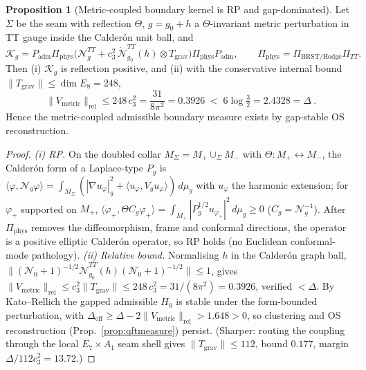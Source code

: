 \documentclass[11pt,a4paper]{article}
\newcommand{\cthree}{c_3}
\theoremstyle{definition}
\newtheorem{proposition}{Proposition}
\begin{document}
\begin{proposition}[Metric-coupled boundary kernel is RP and gap-dominated]
\label{prop:metricrp}
Let $\Sigma$ be the seam with reflection $\Theta$, $g=g_0+h$ a $\Theta$-invariant metric perturbation in
TT gauge inside the Calder\'on unit ball, and
\[
  \mathcal K_g=P_{\mathrm{adm}}\Pi_{\mathrm{phys}}\bigl(\mathcal N^{TT}_g
  +\cthree^2\,\dot{\mathcal N}^{TT}_{g_0}(h)\otimes T_{\mathrm{grav}}\bigr)\Pi_{\mathrm{phys}}P_{\mathrm{adm}},
  \qquad \Pi_{\mathrm{phys}}=\Pi_{\mathrm{BRST/Hodge}}\Pi_{TT}.
\]
Then (i) $\mathcal K_g$ is reflection positive, and (ii) with the conservative internal bound
$\|T_{\mathrm{grav}}\|\le\dim E_8=248$,
\[
  \boxed{\ \|V_{\mathrm{metric}}\|_{\mathrm{rel}}\le 248\,\cthree^2=\frac{31}{8\pi^2}=0.3926
  \;<\;6\log\tfrac32=2.4328=\Delta\ }.
\]
Hence the metric-coupled admissible boundary measure exists by gap-stable OS reconstruction.
\end{proposition}
\begin{proof}
\emph{(i) RP.} On the doubled collar $M_\Sigma=M_+\cup_\Sigma M_-$ with $\Theta:M_+\leftrightarrow M_-$,
the Calder\'on form of a Laplace-type $P_g$ is
$\langle\varphi,\mathcal N_g\varphi\rangle=\int_{M_\Sigma}(|\nabla u_\varphi|_g^2+\langle u_\varphi,V_g u_\varphi\rangle)\,d\mu_g$
with $u_\varphi$ the harmonic extension; for $\varphi_+$ supported on $M_+$,
$\langle\varphi_+,\Theta C_g\varphi_+\rangle=\int_{M_+}|P_g^{1/2}u_{\varphi_+}|^2\,d\mu_g\ge0$
($C_g=\mathcal N_g^{-1}$). After $\Pi_{\mathrm{phys}}$ removes the diffeomorphism, frame and conformal
directions, the operator is a positive elliptic Calder\'on operator, so RP holds (no Euclidean
conformal-mode pathology). \emph{(ii) Relative bound.} Normalising $h$ in the Calder\'on graph ball,
$\|(\mathcal N_0+1)^{-1/2}\dot{\mathcal N}^{TT}_{g_0}(h)(\mathcal N_0+1)^{-1/2}\|\le1$, gives
$\|V_{\mathrm{metric}}\|_{\mathrm{rel}}\le\cthree^2\|T_{\mathrm{grav}}\|\le248\,\cthree^2=31/(8\pi^2)=0.3926$,
verified $<\Delta$. By Kato--Rellich the gapped admissible $H_0$ is stable under the form-bounded
perturbation, with $\Delta_{\mathrm{eff}}\ge\Delta-2\|V_{\mathrm{metric}}\|_{\mathrm{rel}}>1.648>0$, so
clustering and OS reconstruction (Prop.~\ref{prop:qftmeasure}) persist. (Sharper: routing the coupling
through the local $E_7{\times}A_1$ seam shell gives $\|T_{\mathrm{grav}}\|\le112$, bound $0.177$, margin
$\Delta/112\cthree^2=13.72$.)
\end{proof}
\end{document}
